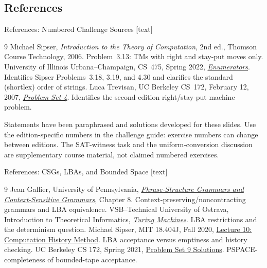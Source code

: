 \documentclass[10pt]{beamer}
\begin{document}
\subsection{References}

\begin{frame}{References: Numbered Challenge Sources}
  \footnotesize
  [text]
  \begin{thebibliography}{9}
      Michael Sipser, \emph{Introduction to the Theory of Computation},
      2nd ed., Thomson Course Technology, 2006.
      Problem~3.13: TMs with right and stay-put moves only.
      University of Illinois Urbana--Champaign, CS~475, Spring 2022,
      \href{https://courses.grainger.illinois.edu/cs475/sp2022/ALL-lectures/Lectures/Day10.pdf}
      {\emph{Enumerators}}.
      Identifies Sipser Problems~3.18, 3.19, and 4.30 and clarifies
      the standard (shortlex) order of strings.
      Luca Trevisan, UC Berkeley CS~172, February 12, 2007,
      \href{https://cs.stanford.edu/people/trevisan/cs172-07/hw4.pdf}
      {\emph{Problem Set 4}}.
      Identifies the second-edition right/stay-put machine problem.
  \end{thebibliography}
  Statements have been paraphrased and solutions developed for these slides.
  Use the edition-specific numbers in the challenge guide: exercise numbers
  can change between editions. The SAT-witness task and the uniform-conversion
  discussion are supplementary course material, not claimed numbered exercises.
\end{frame}

\begin{frame}{References: CSGs, LBAs, and Bounded Space}
  \footnotesize
  [text]
  \begin{thebibliography}{9}
      Jean Gallier, University of Pennsylvania,
      \href{https://www.cis.upenn.edu/~jean/gbooks/cis51104sl13pdf.pdf}
      {\emph{Phrase-Structure Grammars and Context-Sensitive Grammars}},
      Chapter 8. Context-preserving/noncontracting grammars and LBA equivalence.
      VSB--Technical University of Ostrava, Introduction to Theoretical Informatics,
      \href{https://www.cs.vsb.cz/sawa/uti/slides/uti-06-en.pdf}
      {\emph{Turing Machines}}. LBA restrictions and the determinism question.
      Michael Sipser, MIT 18.404J, Fall 2020,
      \href{https://ocw.mit.edu/courses/18-404j-theory-of-computation-fall-2020/a48f01c5374e72ee4f68a70bc0e38583_MIT18_404f20_lec10.pdf}
      {Lecture 10: Computation History Method}.
      LBA acceptance versus emptiness and history checking.
      UC Berkeley CS 172, Spring 2021,
      \href{https://people.eecs.berkeley.edu/~sinclair/cs172/sol9.pdf}
      {Problem Set 9 Solutions}.
      PSPACE-completeness of bounded-tape acceptance.
  \end{thebibliography}
\end{frame}
\end{document}
